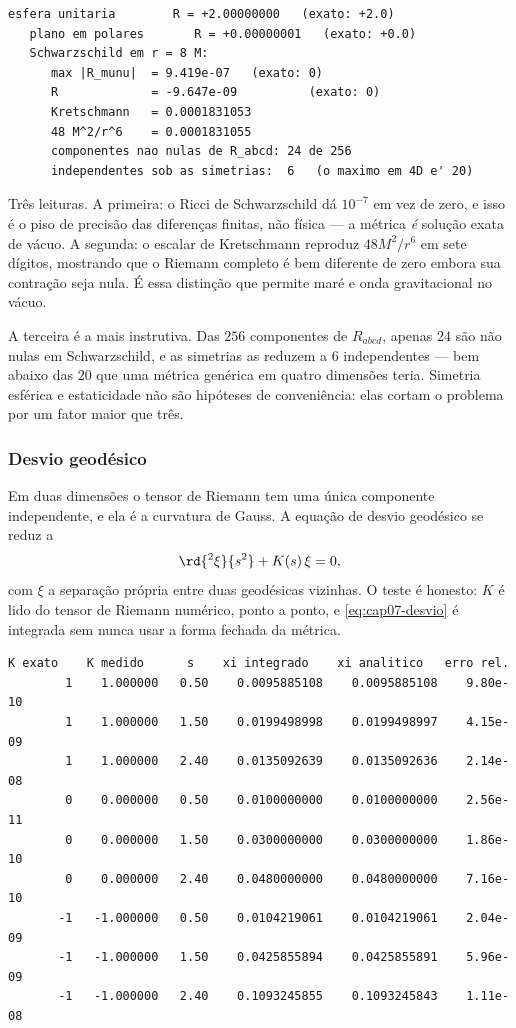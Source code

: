 \begin{saida}
\begin{lstlisting}[style=rgsaida]
   esfera unitaria        R = +2.00000000   (exato: +2.0)
   plano em polares       R = +0.00000001   (exato: +0.0)
   Schwarzschild em r = 8 M:
      max |R_munu|  = 9.419e-07   (exato: 0)
      R             = -9.647e-09          (exato: 0)
      Kretschmann   = 0.0001831053
      48 M^2/r^6    = 0.0001831055
      componentes nao nulas de R_abcd: 24 de 256
      independentes sob as simetrias:  6   (o maximo em 4D e' 20)
\end{lstlisting}
\end{saida}

Três leituras. A primeira: o Ricci de Schwarzschild dá $10^{-7}$ em vez de
zero, e isso é o piso de precisão das diferenças finitas, não física --- a
métrica \emph{é} solução exata de vácuo. A segunda: o escalar de Kretschmann
reproduz $48M^2/r^6$ em sete dígitos, mostrando que o Riemann completo é bem
diferente de zero embora sua contração seja nula. É essa distinção que
permite maré e onda gravitacional no vácuo.

A terceira é a mais instrutiva. Das $256$ componentes de $R_{abcd}$, apenas
$24$ são não nulas em Schwarzschild, e as simetrias as reduzem a $6$
independentes --- bem abaixo das $20$ que uma métrica genérica em quatro
dimensões teria. Simetria esférica e estaticidade não são hipóteses de
conveniência: elas cortam o problema por um fator maior que três.

\subsubsection*{Desvio geodésico}

Em duas dimensões o tensor de Riemann tem uma única componente independente,
e ela é a curvatura de Gauss. A equação de desvio geodésico se reduz a
\begin{equation}
  \rd{^2\xi}{s^2}+K(s)\,\xi=0,
  \label{eq:cap07-desvio}
\end{equation}
com $\xi$ a separação própria entre duas geodésicas vizinhas. O teste é
honesto: $K$ é lido do tensor de Riemann numérico, ponto a ponto, e
\eqref{eq:cap07-desvio} é integrada sem nunca usar a forma fechada da
métrica.

\begin{saida}
\begin{lstlisting}[style=rgsaida]
  K exato    K medido      s    xi integrado    xi analitico   erro rel.
        1    1.000000   0.50    0.0095885108    0.0095885108    9.80e-10
        1    1.000000   1.50    0.0199498998    0.0199498997    4.15e-09
        1    1.000000   2.40    0.0135092639    0.0135092636    2.14e-08
        0    0.000000   0.50    0.0100000000    0.0100000000    2.56e-11
        0    0.000000   1.50    0.0300000000    0.0300000000    1.86e-10
        0    0.000000   2.40    0.0480000000    0.0480000000    7.16e-10
       -1   -1.000000   0.50    0.0104219061    0.0104219061    2.04e-09
       -1   -1.000000   1.50    0.0425855894    0.0425855891    5.96e-09
       -1   -1.000000   2.40    0.1093245855    0.1093245843    1.11e-08
\end{lstlisting}
\end{saida}

